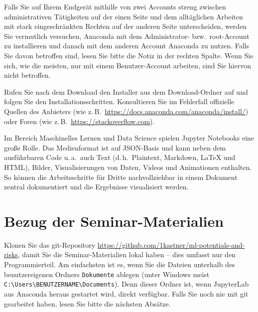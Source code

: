 \documentclass[nobib]{tufte-handout}
\begin{document}
Falls Sie auf Ihrem Endgerät mithilfe von zwei Accounts streng zwischen administrativen Tätigkeiten auf der einen Seite und dem alltäglichen Arbeiten mit stark eingeschränkten Rechten auf der anderen Seite unterscheiden, werden Sie vermutlich versuchen, Anaconda mit dem Administrator- bzw.\ root-Account zu installieren und danach mit dem anderen Account Anaconda zu nutzen.
Falls Sie davon betroffen sind, lesen Sie bitte die Notiz in der rechten Spalte.
%
Wenn Sie sich, wie die meisten, nur mit einem Benutzer-Account arbeiten, sind Sie hiervon nicht betroffen.

Rufen Sie nach dem Download den Installer aus dem Download-Ordner auf und folgen Sie den Installationsschritten.
Konsultieren Sie im Fehlerfall offizielle Quellen des Anbieters
(wie z.\,B.\ \url{https://docs.anaconda.com/anaconda/install/})
oder Foren
(wie z.\,B.\ \url{https://stackoverflow.com}).


Im Bereich Maschinelles Lernen und Data Science spielen Jupyter Notebooks eine  große Rolle.
Das Medienformat ist auf JSON-Basis und kann neben dem ausführbaren Code
u.\,a.\ auch
Text (d.\,h.\ Plaintext, Markdown, LaTeX und HTML),
Bilder,
Visualisierungen von Daten,
Videos und
Animationen
enthalten.
So können die Arbeitsschritte für Dritte nachvollziehbar in einem Dokument zentral dokumentiert und die Ergebnisse visualisiert werden.


\section{Bezug der Seminar-Materialien}
\label{sec:git-clone}

Klonen Sie das git-Repository
\url{https://github.com/1kastner/ml-potentials-and-risks},
damit Sie die Seminar-Materialien lokal haben -- dies umfasst nur den Programmierteil.
Am einfachsten ist es, wenn Sie die Dateien unterhalb des benutzer\-eigenen Ordners \texttt{Dokumente} ablegen
(unter Windows meist \texttt{C:\textbackslash{}Users\textbackslash{}BENUTZERNAME\textbackslash{}Documents}).
Denn dieser Ordner ist, wenn JupyterLab aus Anaconda heraus gestartet wird, direkt verfügbar.
Falls Sie noch nie mit git gearbeitet haben, lesen Sie bitte die nächsten Absätze.
\end{document}
